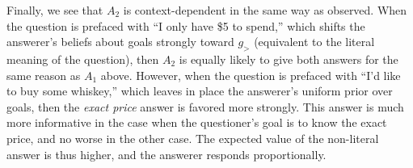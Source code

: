 \documentclass[12pt, floatsintext, jou]{apa6}
\begin{document}
Finally, we see that $A_2$ is context-dependent in the same way as  observed. When the question is prefaced with ``I only have \$5 to spend,'' which shifts the answerer's beliefs about goals strongly toward $g_>$ (equivalent to the literal meaning of the question), then $A_2$ is equally likely to give both answers for the same reason as $A_1$ above. However, when the question is prefaced with ``I'd like to buy some whiskey,'' which leaves in place the answerer's uniform prior over goals, then the \emph{exact price} answer is favored more strongly. This answer is much more informative in the case when the questioner's goal is to know the exact price, and no worse in the other case. The expected value of the non-literal answer is thus higher, and the answerer responds proportionally. 


\end{document}
